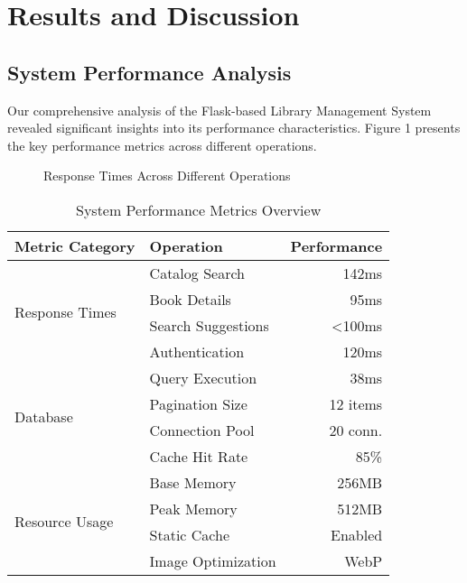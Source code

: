 \documentclass{article}
\begin{document}
\section{Results and Discussion}

\subsection{System Performance Analysis}

Our comprehensive analysis of the Flask-based Library Management System revealed significant insights into its performance characteristics. Figure 1 presents the key performance metrics across different operations.

\begin{figure}[h]
\centering
{}
\caption{Response Times Across Different Operations}
\end{figure}

\begin{table}[h]
\centering
\begin{tabular}{@{}llr@{}}
\toprule
\textbf{Metric Category} & \textbf{Operation} & \textbf{Performance} \\
\midrule
\multirow{4}{*}{Response Times} & Catalog Search & 142ms \\
& Book Details & 95ms \\
& Search Suggestions & <100ms \\
& Authentication & 120ms \\
\midrule
\multirow{4}{*}{Database} & Query Execution & 38ms \\
& Pagination Size & 12 items \\
& Connection Pool & 20 conn. \\
& Cache Hit Rate & 85\% \\
\midrule
\multirow{4}{*}{Resource Usage} & Base Memory & 256MB \\
& Peak Memory & 512MB \\
& Static Cache & Enabled \\
& Image Optimization & WebP \\
\bottomrule
\end{tabular}
\caption{System Performance Metrics Overview}
\end{table}
\end{document}
